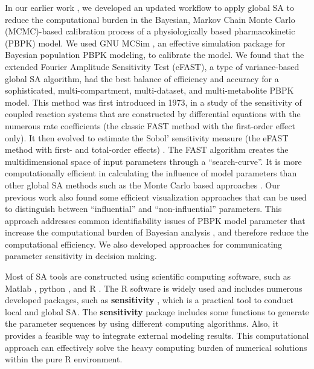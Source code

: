 \documentclass[preprint,12pt, a4paper]{elsarticle}
\begin{document}
In our earlier work \cite{fphar201800588}, we developed an updated workflow to apply global SA to reduce the computational burden in the Bayesian, Markov Chain Monte Carlo (MCMC)-based calibration process of a physiologically based pharmacokinetic (PBPK) model. We used GNU MCSim \cite{bois2009gnu}, an effective simulation package for Bayesian population PBPK modeling, to calibrate the model. We found that the extended Fourier Amplitude Sensitivity Test (eFAST), a type of variance-based global SA algorithm, had the best balance of efficiency and accuracy for a sophisticated, multi-compartment, multi-dataset, and multi-metabolite PBPK model. This method was first introduced in 1973,  \cite{cukier1973study} in a study of the sensitivity of coupled reaction systems that are constructed by differential equations with the numerous rate coefficients (the classic FAST method with the first-order effect only). It then evolved to estimate the Sobol' sensitivity measure (the eFAST method with first- and total-order effects) \cite{saltelli1999quantitative}. The FAST algorithm creates the multidimensional space of input parameters through a ``search-curve''. It is more computationally efficient in calculating the influence of model parameters than other global SA methods such as the Monte Carlo based approaches \cite{jansen1999analysis, owen2013better}. Our previous work also found some efficient visualization approaches that can be used to distinguish between ``influential'' and ``non-influential'' parameters. This approach addresses common identifiability issues of PBPK model parameter that increase the computational burden of Bayesian analysis \cite{garcia2015identifiability}, and therefore reduce the computational efficiency. We also developed approaches for communicating parameter sensitivity in decision making.

Most of SA tools are constructed using scientific computing software, 
such as Matlab \cite{pianosi2015matlab}, python \cite{herman2017salib}, and R \cite{iooss2017introduction}. The R software is widely used and includes numerous developed packages, such as \textbf{sensitivity} \cite{R-sensitivity}, which is a practical tool to conduct local and global SA. The \textbf{sensitivity} package includes some functions to generate the parameter sequences by using different computing algorithms. Also, it provides a feasible way to integrate external modeling results. This computational approach can effectively solve the heavy computing burden of numerical solutions within the pure R environment. 
\end{document}
